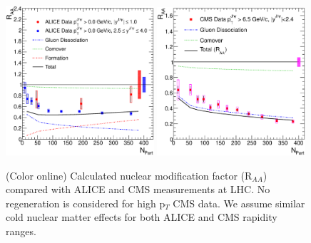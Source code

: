 \documentclass[aps,prc,preprint,superscriptaddress,showpacs,showkeys]{revtex4-1}
\begin{document}
\begin{figure}
\includegraphics[width=0.49\textwidth]{ALICE_RAA.eps}
\includegraphics[width=0.49\textwidth]{CMS_RAA_JPsi.eps}
\caption{(Color online) Calculated nuclear modification factor (R$_{AA}$) compared with ALICE and CMS measurements at LHC. No regeneration is 
considered for high p$_{T}$ CMS data. We assume similar cold nuclear matter effects for both ALICE and CMS rapidity ranges.}
\label{fig:JPsiRaa}
\end{figure}
\end{document}
